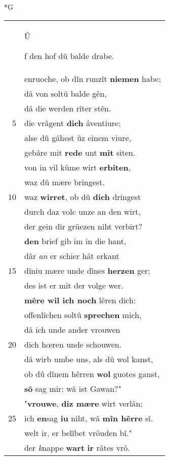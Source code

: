 \documentclass[8pt,a4paper,notitlepage]{article}
\begin{document}
\begin{table}[ht]
\begin{minipage}[t]{0.5\linewidth}
\small
\begin{center}*G
\end{center}
\begin{tabular}{rl}
 & \begin{large}Û\end{large}f den hof dû balde drabe.\\ 
 & enruoche, ob dîn runzît \textbf{niemen} habe;\\ 
 & dâ von soltû balde gên,\\ 
 & dâ die werden rîter stên.\\ 
5 & die vrâgent \textbf{dich} âventiure;\\ 
 & alse dû gâhest ûz einem viure,\\ 
 & gebâre mit \textbf{rede} unt \textbf{mit} siten.\\ 
 & von in vil kûme wirt \textbf{erbiten},\\ 
 & waz dû mære bringest.\\ 
10 & waz \textbf{wirret}, ob dû \textbf{dich} dringest\\ 
 & durch daz volc unze an den wirt,\\ 
 & der gein dir grüezen niht verbirt?\\ 
 & \textbf{den} brief gib im in die hant,\\ 
 & dâr \textit{an} er schier hât erkant\\ 
15 & dîniu mære unde dînes \textbf{herzen} ger;\\ 
 & des ist er mit der volge wer.\\ 
 & \textbf{mêre wil ich noch} lêren dich:\\ 
 & offenlîchen soltû \textbf{sprechen} mich,\\ 
 & dâ ich unde ander vrouwen\\ 
20 & dich hœren unde schouwen.\\ 
 & dâ wirb umbe uns, als dû wol kanst,\\ 
 & ob dû dînem hêrren \textbf{wol} guotes ganst,\\ 
 & \textbf{sô} sag mir: wâ ist Gawan?"\\ 
 & "\textbf{vrouwe}, \textbf{diz mære} wirt verlân;\\ 
25 & ich \textbf{en}sag \textbf{iu} niht, wâ \textbf{mîn hêrre} sî.\\ 
 & welt ir, er belîbet vröuden bî."\\ 
 & der \textit{k}nappe \textbf{wart} \textbf{ir} râtes vrô.\\ 

\end{tabular}
\end{minipage}
\end{table}
\end{document}
